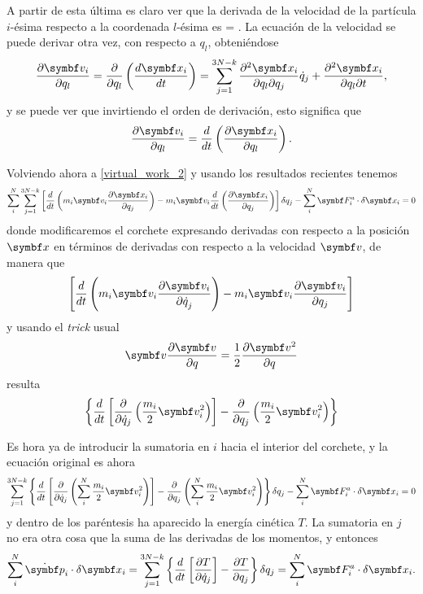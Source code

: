 \documentclass[10pt,oneside]{CBFT_book}
\begin{document}
A partir de esta última es claro ver que la derivada de la velocidad de la partícula $i$-ésima respecto a la coordenada 
$l$-ésima es
\be
	 = .
	\label{relacion_derivadas}
\ee
{}
La ecuación de la velocidad se puede derivar otra vez, con respecto a $q_l$, obteniéndose
\[
	\dpar{\vb{v}_i}{q_l} = \frac{\partial}{\partial q_l} \left( \dtot{\vb{x}_i}{t} \right) =
	\sum_{j=1}^{3N-k} \dparcru{\vb{x}_i}{q_j}{q_l} \dot{q}_j + 
	\dparcru{\vb{x}_i}{t}{q_l},
\]
y se puede ver que invirtiendo el orden de derivación, esto significa que 
\[
	\dpar{\vb{v}_i}{q_l} = \frac{d}{dt} \left( \dpar{\vb{x}_i}{q_l} \right).
\]

% 

Volviendo ahora a \eqref{virtual_work_2} y usando los resultados recientes tenemos
\[
	\sum_i^N \sum_{j=1}^{3N-k} 
	\left[ \frac{d}{dt} \left( m_i \vb{v}_i \dpar{\vb{x}_i}{q_j} \right) - 
	m_i \vb{v}_i \frac{d}{dt}\left( \dpar{\vb{x}_i}{q_j} \right) \right] \delta q_j
	- \sum_i^N  \vb{F}_i^a \cdot \delta \vb{x}_i = 0
\]
donde modificaremos el corchete expresando derivadas con respecto a la posición $\vb{x}$ en términos
de derivadas con respecto a la velocidad $\vb{v}$, de manera que 
\[
	\left[ \frac{d}{dt} \left( m_i \vb{v}_i \dpar{\vb{v}_i}{\dot{q}_j} \right) -
	m_i \vb{v}_i \dpar{\vb{v}_i}{q_j} \right]
\]
y usando el {\it trick} usual
\[
	\vb{v} \dpar{\vb{v}}{q} = \frac{1}{2} \dpar{ \vb{v}^2 }{q} 
\]
resulta
\[
	\left\{ 
	\frac{d}{dt} \left[ \frac{\partial}{\partial \dot{q}_j} \left( \frac{m_i}{2} \vb{v}_i^2 \right) \right] - 
	\frac{\partial}{\partial q_j} \left( \frac{m_i}{2} \vb{v}_i^2 \right) \right\}
\]

Es hora ya de introducir la sumatoria en $i$ hacia el interior del corchete, y la ecuación original es ahora 
\[
	\sum_{j=1}^{3N-k} \left\{ 
	\frac{d}{dt} \left[ \frac{\partial}{\partial \dot{q}_j}
	\left( \sum_i^N \frac{m_i}{2} \vb{v}_i^2 \right) \right] 
	- \frac{\partial}{\partial q_j} \left( \sum_i^N \frac{m_i}{2} \vb{v}_i^2 \right) \right\} \delta q_j
	- \sum_i^N  \vb{F}_i^a \cdot \delta \vb{x}_i = 0
\]
y dentro de los paréntesis ha aparecido la energía cinética $T$. La sumatoria en $j$ no era otra cosa que la suma 
de las derivadas de los momentos, y entonces
\[
	\sum_i^N \dot{\vb{p}}_i \cdot \delta \vb{x}_i =
	\sum_{j=1}^{3N-k} \left\{ \frac{d}{dt} \left[ \frac{\partial T}{\partial \dot{q}_j} \right] -
	\frac{\partial T}{\partial q_j} \right\} \delta q_j = \sum_i^N  \vb{F}_i^a \cdot \delta \vb{x}_i.
\]
\end{document}
